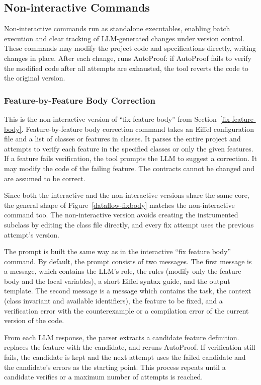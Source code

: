 \documentclass[runningheads]{llncs}
\newcommand{\secref}[1]{Section~\ref{#1}}
\newcommand{\figref}[1]{Figure~\ref{#1}}
\begin{document}
\subsection{Non-interactive Commands}

Non-interactive commands run as standalone executables, enabling batch execution and clear tracking of LLM-generated changes under version control.
These commands may modify the project code and specifications directly, writing changes in place.
After each change, \toolname{} runs AutoProof: if AutoProof fails to verify the modified code
after all attempts are exhausted, the tool reverts the code to the original version.

\subsubsection{Feature-by-Feature Body Correction}\label{feature-by-feature}
This is the non-interactive version of ``fix feature body'' from \secref{fix-feature-body}.
Feature-by-feature body correction command takes an Eiffel configuration file and a list of classes or
features in classes.
It parses the entire project and attempts to verify each feature in the specified classes
or only the given features.
If a feature fails verification, the tool prompts the LLM to suggest a correction.
It may modify the code of the failing feature. The contracts cannot be changed
and are assumed to be correct.

Since both the interactive and the non-interactive versions share the same core,
the general shape of \figref{dataflow-fixbody} matches the non-interactive command too.
The non-interactive version avoids creating the instrumented subclass
by editing the class file directly, and every fix attempt uses the previous attempt's version.

The prompt is built the same way as in the interactive ``fix feature body'' command.
By default, the prompt consists of two messages. The first message is a 
message, which contains the LLM's role, the rules (modify only the feature body and the local variables),
a short Eiffel syntax guide, and the output template.
The second message is a  message which contains the task,
the context (class invariant and available identifiers),
the feature to be fixed,
and a verification error with the counterexample or a compilation error of the current version of the code.

From each LLM response, the parser extracts a candidate feature definition.
\toolname{} replaces the feature with the candidate, and reruns AutoProof.
If verification still fails, the candidate is kept and the next attempt
uses the failed candidate and the candidate's errors as the starting point.
This process repeats until a candidate verifies or a maximum number of attempts is reached.
\end{document}
